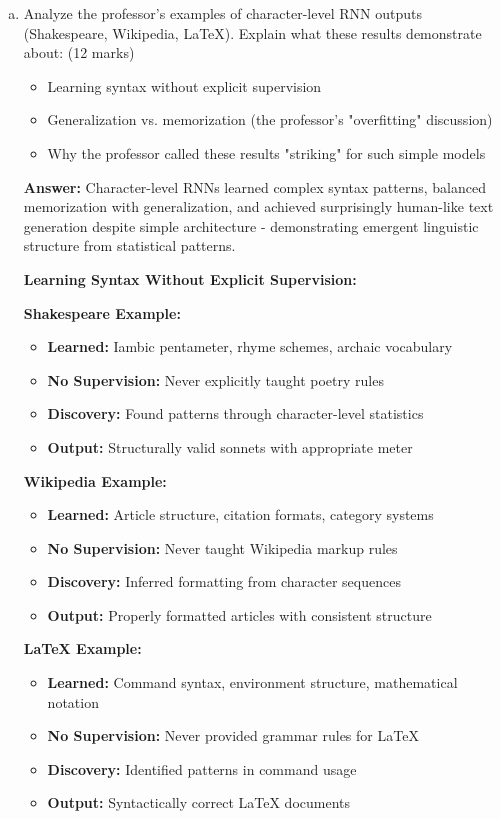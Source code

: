 \documentclass[12pt]{article}
\newcommand{\answer}[1]{{\color{answercolor}\textbf{Answer:} #1}}
\newcommand{\explanation}[1]{{\color{explanationcolor}#1}}
\begin{document}
\begin{enumerate}[(a)]
    \item Analyze the professor's examples of character-level RNN outputs (Shakespeare, Wikipedia, LaTeX). Explain what these results demonstrate about: \hfill (12 marks)
    \begin{itemize}
        \item Learning syntax without explicit supervision
        \item Generalization vs. memorization (the professor's "overfitting" discussion)
        \item Why the professor called these results "striking" for such simple models
    \end{itemize}
    
    \answer{Character-level RNNs learned complex syntax patterns, balanced memorization with generalization, and achieved surprisingly human-like text generation despite simple architecture - demonstrating emergent linguistic structure from statistical patterns.}
    
    \explanation{
    \textbf{Learning Syntax Without Explicit Supervision:}
    
    \textbf{Shakespeare Example:}
    \begin{itemize}
        \item \textbf{Learned:} Iambic pentameter, rhyme schemes, archaic vocabulary
        \item \textbf{No Supervision:} Never explicitly taught poetry rules
        \item \textbf{Discovery:} Found patterns through character-level statistics
        \item \textbf{Output:} Structurally valid sonnets with appropriate meter
    \end{itemize}
    
    \textbf{Wikipedia Example:}
    \begin{itemize}
        \item \textbf{Learned:} Article structure, citation formats, category systems
        \item \textbf{No Supervision:} Never taught Wikipedia markup rules
        \item \textbf{Discovery:} Inferred formatting from character sequences
        \item \textbf{Output:} Properly formatted articles with consistent structure
    \end{itemize}
    
    \textbf{LaTeX Example:}
    \begin{itemize}
        \item \textbf{Learned:} Command syntax, environment structure, mathematical notation
        \item \textbf{No Supervision:} Never provided grammar rules for LaTeX
        \item \textbf{Discovery:} Identified patterns in command usage
        \item \textbf{Output:} Syntactically correct LaTeX documents
    \end{itemize}
    
}
\end{enumerate}
\end{document}
